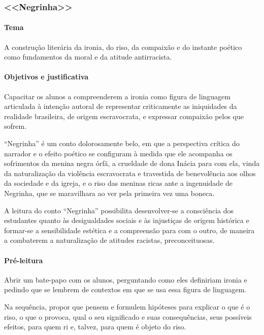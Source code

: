 \documentclass[11pt]{extarticle}
\begin{document}
\subsubsection{<<Negrinha>>}

\paragraph{Tema} A construção literária da ironia, do riso, da compaixão e do instante
poético como fundamentos da moral e da atitude antirracista.

\paragraph{Objetivos e justificativa}
Capacitar os alunos a compreenderem a ironia como figura de linguagem
articulada à intenção autoral de representar criticamente as iniquidades
da realidade brasileira, de origem escravocrata, e expressar compaixão
pelos que sofrem.

``Negrinha'' é um conto dolorosamente belo, em que a perspectiva crítica
do narrador e o efeito poético se configuram à medida que ele acompanha
os sofrimentos da menina negra órfã, a crueldade de dona Inácia para com
ela, vinda da naturalização da violência escravocrata e travestida de
benevolência aos olhos da sociedade e da igreja, e o riso das meninas
ricas ante a ingenuidade de Negrinha, que se maravilhara ao ver pela
primeira vez uma boneca.

A leitura do conto ``Negrinha'' possibilita desenvolver-se a consciência
dos estudantes quanto às desigualdades sociais e às injustiças de origem
histórica e formar-se a sensibilidade estética e a compreensão para com
o outro, de maneira a combaterem a naturalização de atitudes racistas,
preconceituosas.


\asterisc{}

\paragraph{Pré-leitura}

Abrir um bate-papo com os alunos, perguntando como eles definiriam
ironia e pedindo que se lembrem de contextos em que se usa essa figura
de linguagem.

Na sequência, propor que pensem e formulem hipóteses para explicar o que
é o riso, o que o provoca, qual o seu significado e suas consequências,
seus possíveis efeitos, para quem ri e, talvez, para quem é objeto do
riso.
\end{document}
